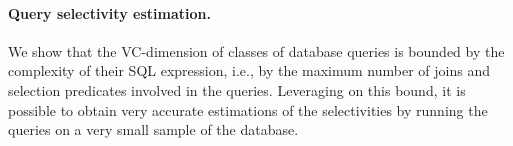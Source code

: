 \paragraph*{Query selectivity estimation.}  We show that the VC-dimension of
classes of database queries is bounded by the complexity of their SQL
expression, i.e., by the maximum number of joins and selection predicates
involved in the queries. Leveraging on this bound, it is possible to obtain very
accurate estimations of the selectivities by running the queries on a very small
sample of the database. 

%
%
%
%
%
%
%
